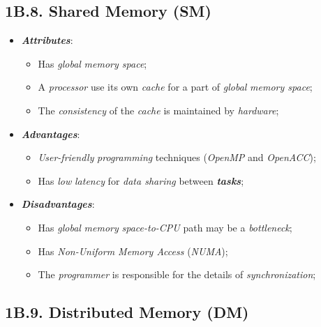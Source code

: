 \subsection*{\large{\textbf{1B.8. Shared Memory (SM)}}}
\label{ssec:lecture-1B7}

\begin{itemize}
    \item \textbf{\emph{Attributes}}:
    \vspace{-0.2cm}
    \begin{itemize}
        \item Has \emph{global} \emph{memory space};
        \item A \emph{processor} use its own \emph{cache} for a part of \emph{global} \emph{memory space};
        \item The \emph{consistency} of the \emph{cache} is maintained by \emph{hardware};
    \end{itemize}
    \item \textbf{\emph{Advantages}}:
    \vspace{-0.2cm}
    \begin{itemize}
        \item \emph{User-friendly} \emph{programming} techniques (\emph{OpenMP} and \emph{OpenACC});
        \item Has \emph{low} \emph{latency} for \emph{data sharing} between \textbf{\emph{tasks}};
    \end{itemize}
    \item \textbf{\emph{Disadvantages}}:
    \vspace{-0.2cm}
    \begin{itemize}
        \item Has \emph{global} \emph{memory} \emph{space-to-CPU} path may be a \emph{bottleneck};
        \item Has \emph{Non-Uniform Memory Access} (\emph{NUMA});
        \item The \emph{programmer} is responsible for the details of \emph{synchronization};
    \end{itemize}
\end{itemize}

\newpage

\subsection*{\large{\textbf{1B.9. Distributed Memory (DM)}}}
\label{ssec:lecture-1B9}

